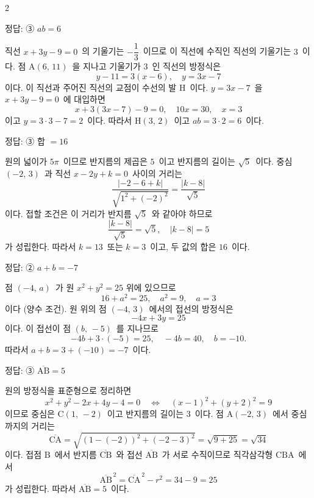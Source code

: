 \documentclass[10pt,fleqn]{article}
\begin{document}
\begin{multicols*}{2}
\begin{dmanswerbox}
정답: ③ $ab=6$
\end{dmanswerbox}

직선 $x+3y-9=0$\ 의 기울기는 $-\dfrac{1}{3}$\ 이므로 이 직선에 수직인 직선의 기울기는 $3$\ 이다. 점 $\mathrm{A}(6,\,11)$\ 을 지나고 기울기가 $3$\ 인 직선의 방정식은
\[ y-11 = 3(x-6),\quad y=3x-7 \]
이다. 이 직선과 주어진 직선의 교점이 수선의 발 $\mathrm{H}$\ 이다. $y=3x-7$\ 을 $x+3y-9=0$\ 에 대입하면
\[ x+3(3x-7)-9 = 0,\quad 10x=30,\quad x=3 \]
이고 $y=3\cdot 3-7=2$\ 이다. 따라서 $\mathrm{H}(3,\,2)$\ 이고 $ab=3\cdot 2=6$\ 이다.

\begin{dmanswerbox}
정답: ③ 합 $=16$
\end{dmanswerbox}

원의 넓이가 $5\pi$\ 이므로 반지름의 제곱은 $5$\ 이고 반지름의 길이는 $\sqrt{5}$\ 이다. 중심 $(-2,\,3)$\ 과 직선 $x-2y+k=0$\ 사이의 거리는
\[ \dfrac{|-2-6+k|}{\sqrt{1^2+(-2)^2}} = \dfrac{|k-8|}{\sqrt{5}} \]
이다. 접할 조건은 이 거리가 반지름 $\sqrt{5}$\ 와 같아야 하므로
\[ \dfrac{|k-8|}{\sqrt{5}} = \sqrt{5},\quad |k-8|=5 \]
가 성립한다. 따라서 $k=13$\ 또는 $k=3$\ 이고, 두 값의 합은 $16$\ 이다.

\begin{dmanswerbox}
정답: ② $a+b=-7$
\end{dmanswerbox}

점 $(-4,\,a)$\ 가 원 $x^2+y^2=25$ 위에 있으므로
\[ 16+a^2=25,\quad a^2=9,\quad a=3 \]
이다 (양수 조건). 원 위의 점 $(-4,\,3)$\ 에서의 접선의 방정식은
\[ -4x+3y = 25 \]
이다. 이 접선이 점 $(b,\,-5)$\ 를 지나므로
\[ -4b + 3\cdot(-5) = 25,\quad -4b = 40,\quad b=-10. \]
따라서 $a+b=3+(-10)=-7$\ 이다.

\begin{dmanswerbox}
정답: ③ $\overline{\mathrm{AB}}=5$
\end{dmanswerbox}

원의 방정식을 표준형으로 정리하면
\[ x^2+y^2-2x+4y-4=0 \quad\Longleftrightarrow\quad (x-1)^2+(y+2)^2 = 9 \]
이므로 중심은 $\mathrm{C}(1,\,-2)$\ 이고 반지름의 길이는 $3$\ 이다. 점 $\mathrm{A}(-2,\,3)$\ 에서 중심까지의 거리는
\[ \overline{\mathrm{CA}} = \sqrt{(1-(-2))^2+(-2-3)^2} = \sqrt{9+25} = \sqrt{34} \]
이다. 접점 $\mathrm{B}$\ 에서 반지름 $\overline{\mathrm{CB}}$\ 와 접선 $\overline{\mathrm{AB}}$\ 가 서로 수직이므로 직각삼각형 $\mathrm{CBA}$\ 에서
\[ \overline{\mathrm{AB}}^{\,2} = \overline{\mathrm{CA}}^{\,2} - r^2 = 34 - 9 = 25 \]
가 성립한다. 따라서 $\overline{\mathrm{AB}} = 5$\ 이다.


\end{multicols*}
\end{document}
